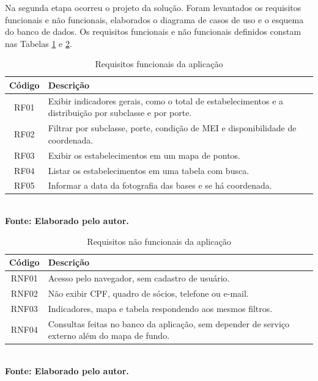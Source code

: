 \documentclass[a4paper,12pt]{article}
\begin{document}
Na segunda etapa ocorreu o projeto da solução.
Foram levantados os requisitos funcionais e não funcionais, elaborados o diagrama de casos de uso e o esquema do banco de dados.
Os requisitos funcionais e não funcionais definidos constam nas Tabelas \ref{tab:rf} e \ref{tab:rnf}.

\begin{table}[htbp]
    \centering
    \caption{Requisitos funcionais da aplicação}
    \label{tab:rf}
    \begin{tabular}{|c|p{11.5cm}|}
        \hline
        \textbf{Código} & \textbf{Descrição} \\
        \hline
        RF01 & Exibir indicadores gerais, como o total de estabelecimentos e a distribuição por subclasse e por porte. \\
        \hline
        RF02 & Filtrar por subclasse, porte, condição de MEI e disponibilidade de coordenada. \\
        \hline
        RF03 & Exibir os estabelecimentos em um mapa de pontos. \\
        \hline
        RF04 & Listar os estabelecimentos em uma tabela com busca. \\
        \hline
        RF05 & Informar a data da fotografia das bases e se há coordenada. \\
        \hline
    \end{tabular}
    \\\textbf{\footnotesize Fonte: Elaborado pelo autor.}
\end{table}

\begin{table}[htbp]
    \centering
    \caption{Requisitos não funcionais da aplicação}
    \label{tab:rnf}
    \begin{tabular}{|c|p{11.5cm}|}
        \hline
        \textbf{Código} & \textbf{Descrição} \\
        \hline
        RNF01 & Acesso pelo navegador, sem cadastro de usuário. \\
        \hline
        RNF02 & Não exibir CPF, quadro de sócios, telefone ou e-mail. \\
        \hline
        RNF03 & Indicadores, mapa e tabela respondendo aos mesmos filtros. \\
        \hline
        RNF04 & Consultas feitas no banco da aplicação, sem depender de serviço externo além do mapa de fundo. \\
        \hline
    \end{tabular}
    \\\textbf{\footnotesize Fonte: Elaborado pelo autor.}
\end{table}
\end{document}
